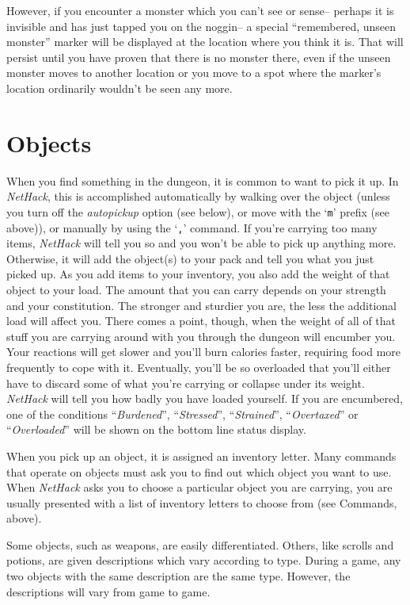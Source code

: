 However, if you encounter a monster which you can't see or sense--
perhaps it is invisible and has just tapped you on the noggin--
a special ``remembered, unseen monster'' marker will be displayed at
the location where you think it is.
That will persist until you have
proven that there is no monster there, even if the unseen monster
moves to another location or you move to a spot where the marker's
location ordinarily wouldn't be seen any more.

\section{Objects}

When you find something in the dungeon, it is common to want to pick
it up.  In {\it NetHack}, this is accomplished automatically by walking over
the object (unless you turn off the {\it autopickup\/}
option (see below), or move with the `{\tt m}' prefix (see above)), or
manually by using the `{\tt ,}' command.
If you're carrying too many items, {\it NetHack\/} will tell you so and you
won't be able to pick up anything more.  Otherwise, it will add the object(s)
to your pack and tell you what you just picked up.
As you add items to your inventory, you also add the weight of that object
to your load.  The amount that you can carry depends on your strength and
your constitution.  The
stronger and sturdier
you are, the less the additional load will affect you.  There comes
a point, though, when the weight of all of that stuff you are carrying around
with you through the dungeon will encumber you.  Your reactions
will get slower and you'll burn calories faster, requiring food more frequently
to cope with it.  Eventually, you'll be so overloaded that you'll either have
to discard some of what you're carrying or collapse under its weight.
{\it NetHack\/} will tell you how badly you have loaded yourself.
If you are encumbered, one of the conditions
``{\it Burdened\/}'', ``{\it Stressed\/}'', ``{\it Strained\/}'',
``{\it Overtaxed\/}'' or ``{\it Overloaded\/}'' will be
shown on the bottom line status display.

When you pick up an object, it is assigned an inventory letter.  Many
commands that operate on objects must ask you to find out which object
you want to use.  When {\it NetHack\/} asks you to choose a particular object
you are carrying, you are usually presented with a list of inventory
letters to choose from (see Commands, above).

Some objects, such as weapons, are easily differentiated.  Others, like
scrolls and potions, are given descriptions which vary according to
type.  During a game, any two objects with the same description are
the same type.  However, the descriptions will vary from game to game.

